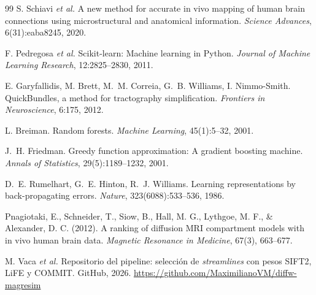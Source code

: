 \documentclass[11pt,a4paper]{article}
\begin{document}
\begin{thebibliography}{99}
 S. Schiavi \textit{et al.} A new method for accurate in vivo mapping
  of human brain connections using microstructural and anatomical information.
  \textit{Science Advances}, 6(31):eaba8245, 2020.

 F. Pedregosa \textit{et al.} Scikit-learn: Machine learning in Python. \textit{Journal of Machine Learning Research}, 12:2825--2830, 2011.

 E. Garyfallidis, M. Brett, M.~M. Correia, G.~B. Williams,
  I. Nimmo-Smith. QuickBundles, a method for tractography simplification. \textit{Frontiers  in Neuroscience}, 6:175, 2012.

 L. Breiman. Random forests. \textit{Machine Learning}, 45(1):5--32, 2001.

 J.~H. Friedman. Greedy function approximation: A gradient boosting
  machine. \textit{Annals of Statistics}, 29(5):1189--1232, 2001.

 D.~E. Rumelhart, G.~E. Hinton, R.~J. Williams. Learning
  representations by back-propagating errors. \textit{Nature}, 323(6088):533--536, 1986.

 Pnagiotaki, E., Schneider, T., Siow, B., Hall, M. G., Lythgoe, M. F., \& Alexander, D. C. (2012). A ranking of diffusion MRI compartment models with in vivo human brain data. \textit{Magnetic Resonance in Medicine}, 67(3), 663--677.

 M. Vaca \textit{et al.} Repositorio del pipeline: selección de \textit{streamlines} con pesos SIFT2, LiFE y COMMIT. GitHub, 2026.
  \url{https://github.com/MaximilianoVM/diffw-magresim}



\end{thebibliography}
\end{document}
